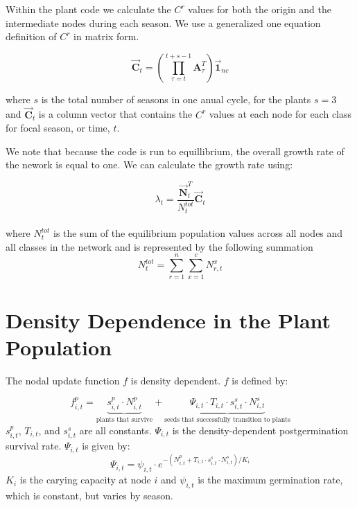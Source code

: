 \documentclass[10pt]{article}
\begin{document}
Within the plant code we calculate the $C^r$ values for both the origin and the intermediate nodes during each season. We use a generalized one equation definition of $C^r$ in matrix form. %

\begin{equation}
\vec{\mathbf{C}}_t=\left(\prod_{\tau=t}^{t+s-1}\mathbf{A}_\tau^T\right)\vec{\mathbf{1}}_{nc}
\end{equation}

where $s$ is the total number of seasons in one anual cycle, for the plants $s=3$ and $\vec{\mathbf{C}}_t$ is a column vector that contains the $C^r$ values at each node for each class for focal season, or time, $t$. 

We note that because the code is run to equillibrium, the overall growth rate of the nework is equal to one. We can calculate the growth rate using:

\begin{equation}
\lambda_t= \frac{\vec{\mathbf{N}}_t^T}{N_t^{tot}}\vec{\mathbf{C}}_t
\label{lambda}
\end{equation}\\
where $N_t^{tot}$ is the sum of the equilibrium population values across all nodes and all classes in the network and is represented by the following summation
\begin{equation}
N_t^{tot}=\sum_{r=1}^n\sum_{x=1}^{c}N^x_{r,t}
\end{equation}

\section{Density Dependence in the Plant Population}
%
The nodal update function $f$ is density dependent. $f$ is defined by:

\begin{equation}\label{f_update}
f_{i,t}^p = \underbrace{s_{i,t}^p\cdot N_{i,t}^p}_\text{plants that survive}+\underbrace{\Psi_{i,t}\cdot T_{i,t}\cdot s_{i,t}^s\cdot N_{i,t}^s}_\text{seeds that successfully transition to plants}
\end{equation}
%
$s_{i,t}^p$, $T_{i,t}$, and $s_{i,t}^s$ are all constants. $\Psi_{i,t}$ is the density-dependent postgermination survival rate. $\Psi_{i,t}$ is given by:
%
\begin{equation}\label{psi_equation}
\Psi_{i,t} = \psi_{i,t} \cdot e^{-(N_{i,t}^p+T_{i,t}\cdot s_{i,t}^s\cdot N_{i,t}^s)/K_i}
\end{equation}
%
$K_i$ is the carying capacity at node $i$ and $\psi_{i,t}$ is the maximum germination rate, which is constant, but varies by season. 
%
\end{document}

